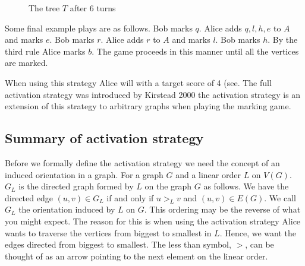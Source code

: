 \begin{figure}[H]
     \caption{The tree $T$ after 6 turns}
     \label{fig:actvStrateg_2}
 \end{figure}
%
Some final example plays are as follows. Bob marks $q$. Alice adds $q,l,h,e$ to $A$ and marks $e$. Bob marks $r$. Alice adds $r$ to $A$ and marks $l$. Bob marks $h$. By the third rule Alice marks $b$. The game proceeds in this manner until all the vertices are marked. 

When using this strategy Alice will with a target score of 4 (see. The full activation strategy was introduced by Kirstead 2000 \cite{KIERSTEAD2000} the activation strategy is an extension of this strategy to arbitrary graphs when playing the marking game.
 
\subsection{Summary of activation strategy}

Before we formally define the activation strategy we need the concept of an induced orientation in a graph. For a graph $G$ and a linear order $L$ on $V(G)$. $G_L$ is the directed graph formed by $L$ on the graph $G$ as follows. We have the directed edge $(u,v)\in G_L$ if and only if $u>_Lv$ and $(u,v)\in E(G)$. We call $G_L$ the orientation induced by $L$ on $G$. This ordering may be the reverse of what you might expect. The reason for this is when using the activation strategy Alice wants to traverse the vertices from biggest to smallest in $L$. Hence, we want the edges directed from biggest to smallest. The less than symbol, $>$, can be thought of as an arrow pointing to the next element on the linear order.

